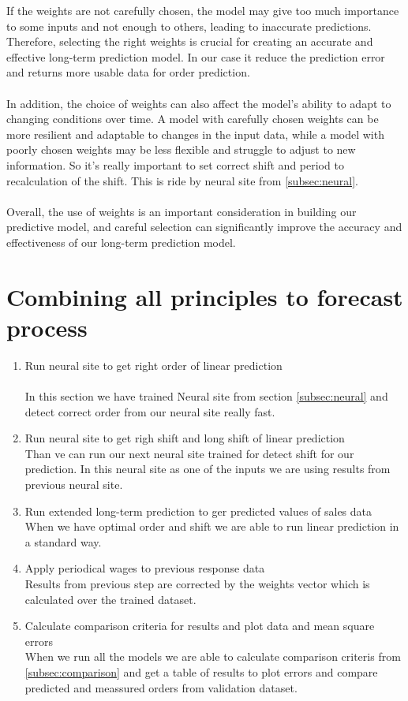     If the weights are not carefully chosen, the model may give too much importance to some inputs and not enough to others,
    leading to inaccurate predictions. Therefore, selecting the right weights is crucial for creating an accurate and effective long-term prediction model.
    In our case it reduce the prediction error and returns more usable data for order prediction.\\
    \\
    In addition, the choice of weights can also affect the model's ability to adapt to changing conditions over time.
    A model with carefully chosen weights can be more resilient and adaptable to changes in the input data,
    while a model with poorly chosen weights may be less flexible and struggle to adjust to new information. So it's really important to set correct
    shift and period to recalculation of the shift. This is ride by neural site from \ref{subsec:neural}.\\
    \\
    Overall, the use of weights is an important consideration in building our predictive model, and careful selection can significantly
    improve the accuracy and effectiveness of our long-term prediction model.

    \section{Combining all principles to forecast process} \label{subsec:combining_models}
    \begin{enumerate}
        \item Run neural site to get right order of linear prediction \\
        \\
        In this section we have trained Neural site from section \ref{subsec:neural} and detect correct order from our neural site
        really fast.  
        \item Run neural site to get righ shift and long shift of linear prediction\\
        Than ve can run our next neural site trained for detect shift for our prediction. In this neural site as one of the inputs
        we are using results from previous neural site.
        \item Run extended long-term prediction to ger predicted values of sales data\\
        When we have optimal order and shift we are able to run linear prediction in a standard way.
        \item Apply periodical wages to previous response data\\
        Results from previous step are corrected by the weights vector which is calculated over the trained dataset.
        \item Calculate comparison criteria for results and plot data and mean square errors\\
        When we run all the models we are able to calculate comparison criteris from \ref{subsec:comparison} and get a table of results to plot errors and compare
        predicted and meassured orders from validation dataset.
    \end{enumerate}

